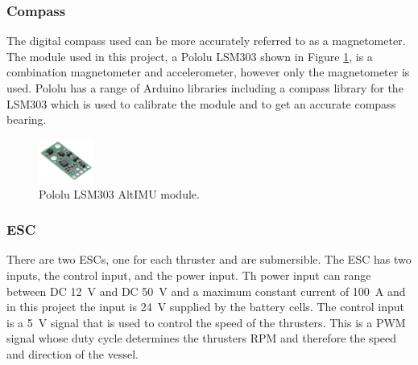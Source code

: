 		\subsubsection{Compass}
		The digital compass used can be more accurately referred to as a magnetometer. The module used in this project, a  Pololu LSM303 shown in Figure \ref{fig:3:compass}, is a combination magnetometer and accelerometer, however only the magnetometer is used. Pololu has a range of Arduino libraries including a compass library for the LSM303 which is used to calibrate the module and to get an accurate compass bearing. \cite{STMicroelectronics2015}
		\begin{figure}[!hb]
			\begin{center}
				\includegraphics[width = 0.16\textwidth]{figures/compass.jpg}
				\caption{Pololu LSM303 AltIMU module.}
				\label{fig:3:compass}
			\end{center}
		\end{figure}
		\subsubsection{ESC}
		There are two ESCs, one for each thruster and are submersible. The ESC has two inputs, the control input, and the power input. Th power input can range between DC \SI{12}{\volt} and DC \SI{50}{\volt} and a maximum constant current of \SI{100}{\ampere} and in this project the input is \SI{24}{\volt} supplied by the battery cells. The control input is a \SI{5}{\volt} signal that is used to control the speed of the thrusters. This is a PWM signal whose duty cycle determines the thrusters RPM and therefore the speed and direction of the vessel. 
